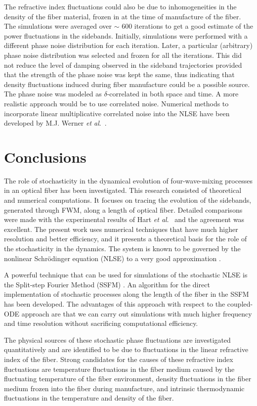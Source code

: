 The refractive index fluctuations could also be due to inhomogeneities in the
density of the fiber material, frozen in at the time of manufacture of the
fiber. The simulations were averaged over $\sim$ 600 iterations to get a good
estimate of the power fluctuations in the sidebands. Initially, simulations
were performed with a different phase noise distribution for each iteration.
Later, a particular (arbitrary) phase noise distribution was selected and
frozen for all the iterations.
This did not reduce the level of damping observed in the sideband trajectories
provided that the strength of the phase noise was kept the same, thus
indicating that density fluctuations induced during fiber manufacture could be
a possible source. The phase noise was modeled as $\delta$-correlated in
both space and time. A more realistic approach would be to use correlated
noise. Numerical methods to incorporate linear multiplicative correlated noise
into the NLSE have been developed by M.J. Werner {\it et al}.\ \cite{werner2}.

\section{Conclusions}

The role of stochasticity in the dynamical evolution of four-wave-mixing
processes in an optical fiber has been investigated. This research consisted
of theoretical and numerical computations. It focuses on tracing the evolution
of the sidebands, generated through FWM, along a length of optical fiber.
Detailed comparisons were made with the experimental results of
Hart {\it et al}.\ \cite{hart1} and the agreement was excellent. The present work
uses numerical techniques that have much higher resolution and better
efficiency, and it presents a theoretical basis for the role of the
stochasticity in the dynamics. The system is known to be governed by the
nonlinear Schr\"odinger equation (NLSE) to a very good
approximation \cite{Agrawal2}.

A powerful technique that can be used for simulations of the stochastic NLSE
is the Split-step Fourier Method (SSFM) \cite{Agrawal2}. An algorithm for the
direct implementation of stochastic processes along the length of the fiber in
the SSFM has been developed. The advantages of this approach with respect to
the coupled-ODE approach are that we can carry out simulations with much
higher frequency and time resolution without sacrificing computational
efficiency.

The physical sources of these stochastic phase fluctuations are investigated
quantitatively and are identified to be due to fluctuations in the linear
refractive index of the fiber. Strong candidates for the causes of these
refractive index fluctuations are temperature fluctuations in the fiber medium
caused by the fluctuating temperature of the fiber environment, density
fluctuations in the fiber medium frozen into the fiber during manufacture, and
intrinsic thermodynamic fluctuations in the temperature and density of the
fiber.

